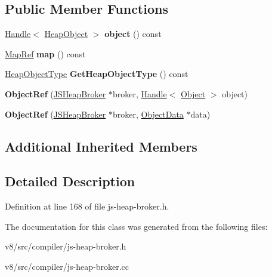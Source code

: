 \subsection*{Public Member Functions}
\begin{DoxyCompactItemize}
\item 
\mbox{\label{classv8_1_1internal_1_1compiler_1_1HeapObjectRef_aa82ae06cb936fbc87ffa864915670509}} 
\mbox{\hyperlink{classv8_1_1internal_1_1Handle}{Handle}}$<$ \mbox{\hyperlink{classv8_1_1internal_1_1HeapObject}{Heap\+Object}} $>$ {\bfseries object} () const
\item 
\mbox{\label{classv8_1_1internal_1_1compiler_1_1HeapObjectRef_ab089d8344c9d0d17e1e99f9a0a742531}} 
\mbox{\hyperlink{classv8_1_1internal_1_1compiler_1_1MapRef}{Map\+Ref}} {\bfseries map} () const
\item 
\mbox{\label{classv8_1_1internal_1_1compiler_1_1HeapObjectRef_a7f810dc91fd5f64187d603980ef30b01}} 
\mbox{\hyperlink{classv8_1_1internal_1_1compiler_1_1HeapObjectType}{Heap\+Object\+Type}} {\bfseries Get\+Heap\+Object\+Type} () const
\item 
\mbox{\label{classv8_1_1internal_1_1compiler_1_1HeapObjectRef_a2fe7bf22ff92737ca562089d7ed4a503}} 
{\bfseries Object\+Ref} (\mbox{\hyperlink{classv8_1_1internal_1_1compiler_1_1JSHeapBroker}{J\+S\+Heap\+Broker}} $\ast$broker, \mbox{\hyperlink{classv8_1_1internal_1_1Handle}{Handle}}$<$ \mbox{\hyperlink{classv8_1_1internal_1_1Object}{Object}} $>$ object)
\item 
\mbox{\label{classv8_1_1internal_1_1compiler_1_1HeapObjectRef_ac99918403fb4debbbe7b18b2b8a3195c}} 
{\bfseries Object\+Ref} (\mbox{\hyperlink{classv8_1_1internal_1_1compiler_1_1JSHeapBroker}{J\+S\+Heap\+Broker}} $\ast$broker, \mbox{\hyperlink{classv8_1_1internal_1_1compiler_1_1ObjectData}{Object\+Data}} $\ast$data)
\end{DoxyCompactItemize}
\subsection*{Additional Inherited Members}


\subsection{Detailed Description}


Definition at line 168 of file js-\/heap-\/broker.\+h.



The documentation for this class was generated from the following files\+:\begin{DoxyCompactItemize}
\item 
v8/src/compiler/js-\/heap-\/broker.\+h\item 
v8/src/compiler/js-\/heap-\/broker.\+cc\end{DoxyCompactItemize}
